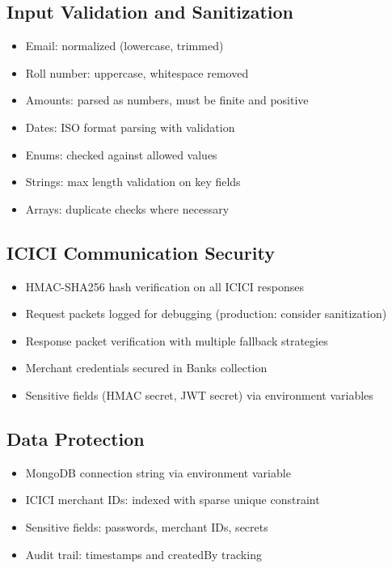 \documentclass[12pt,a4paper]{article}
\begin{document}
\subsection{Input Validation and Sanitization}
\begin{itemize}
  \item Email: normalized (lowercase, trimmed)
  \item Roll number: uppercase, whitespace removed
  \item Amounts: parsed as numbers, must be finite and positive
  \item Dates: ISO format parsing with validation
  \item Enums: checked against allowed values
  \item Strings: max length validation on key fields
  \item Arrays: duplicate checks where necessary
\end{itemize}

\subsection{ICICI Communication Security}
\begin{itemize}
  \item HMAC-SHA256 hash verification on all ICICI responses
  \item Request packets logged for debugging (production: consider sanitization)
  \item Response packet verification with multiple fallback strategies
  \item Merchant credentials secured in Banks collection
  \item Sensitive fields (HMAC secret, JWT secret) via environment variables
\end{itemize}

\subsection{Data Protection}
\begin{itemize}
  \item MongoDB connection string via environment variable
  \item ICICI merchant IDs: indexed with sparse unique constraint
  \item Sensitive fields: passwords, merchant IDs, secrets
  \item Audit trail: timestamps and createdBy tracking
\end{itemize}
\end{document}
